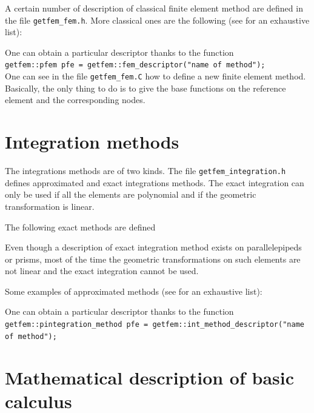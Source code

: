 \documentclass[11pt,a4paper]{article}
\begin{document}
A certain number of description of classical finite element method are defined in the file {\tt getfem\_fem.h}. More classical ones are the following (see \cite{FEM_LIST} for an exhaustive list):


One can obtain a particular descriptor thanks to the function\\[0.5cm]
{\tt getfem::pfem pfe = getfem::fem\_descriptor("name of method"); }\\[0.5cm]
One can see in the file {\tt getfem\_fem.C} how to define a new finite element method. Basically, the only thing to do is to give the base functions on the reference element and the corresponding nodes.

\section{Integration methods}

The integrations methods are of two kinds. The file {\tt getfem\_integration.h} defines approximated and exact integrations methods. The exact integration can only be used if all the elements are polynomial and if the geometric transformation is linear.

The following exact methods are defined



Even though a description of exact integration method exists on parallelepipeds or prisms, most of the time the geometric transformations on such elements are not linear and the exact integration cannot be used.

Some examples of approximated methods (see \cite{FEM_LIST} for an exhaustive list):


One can obtain a particular descriptor thanks to the function\\[0.5cm]
{\tt getfem::pintegration\_method pfe = getfem::int\_method\_descriptor("name of method"); }\\[0.5cm]


\section{Mathematical description of basic calculus}
\end{document}
